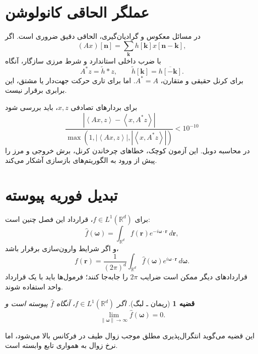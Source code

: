 \documentclass[12pt,openany,oneside]{book}
\newtheorem{theorem}{قضیه}[chapter]
\newcommand{\R}{\mathbb{R}}
\newcommand{\norm}[1]{\left\lVert #1\right\rVert}
\newcommand{\inner}[2]{\left\langle #1,#2\right\rangle}
\newcommand{\vect}[1]{\bm{#1}}
\begin{document}
\section{عملگر الحاقی کانولوشن}

در مسائل معکوس و گرادیان‌گیری، الحاقی دقیق ضروری است. اگر
\begin{equation}
(Ax)[\vect n]=\sum_{\vect k}h[\vect k]x[\vect n-\vect k],
\end{equation}
با ضرب داخلی استاندارد و شرط مرزی سازگار، آنگاه
\begin{equation}
A^*z=\widetilde h*z,
\qquad
\widetilde h[\vect k]=\overline{h[-\vect k]}.
\label{eq:conv-adjoint}
\end{equation}
برای کرنل حقیقی و متقارن، \(A^*=A\). اما برای تاری حرکت جهت‌دار یا مشتق، این برابری برقرار نیست.

\begin{workshopbox}
برای بردارهای تصادفی \(x,z\)، باید بررسی شود
\begin{equation}
\frac{|\inner{Ax}{z}-\inner{x}{A^*z}|}
{\max(1,|\inner{Ax}{z}|,|\inner{x}{A^*z}|)}<10^{-10}
\end{equation}
در محاسبه دوبل. این آزمون کوچک، خطاهای چرخاندن کرنل، برش خروجی و مرز را پیش از ورود به الگوریتم‌های
بازسازی آشکار می‌کند.
\end{workshopbox}

\section{تبدیل فوریه پیوسته}

برای \(f\in L^1(\R^d)\)، قرارداد این فصل چنین است:
\begin{equation}
\widehat f(\vect\omega)=\int_{\R^d}f(\vect r)e^{-i\vect\omega\cdot\vect r}\,d\vect r,
\label{eq:ctft}
\end{equation}
و اگر شرایط وارون‌سازی برقرار باشد،
\begin{equation}
f(\vect r)=\frac{1}{(2\pi)^d}\int_{\R^d}\widehat f(\vect\omega)
 e^{i\vect\omega\cdot\vect r}\,d\vect\omega.
\label{eq:ictft}
\end{equation}
قراردادهای دیگر ممکن است ضرایب \(2\pi\) را جابه‌جا کنند؛ فرمول‌ها باید با یک قرارداد واحد استفاده شوند.

\begin{theorem}[ریمان ـ لبگ]
اگر \(f\in L^1(\R^d)\)، آنگاه \(\widehat f\) پیوسته است و
\begin{equation}
\lim_{\norm{\vect\omega}\to\infty}\widehat f(\vect\omega)=0.
\end{equation}
\end{theorem}
این قضیه می‌گوید انتگرال‌پذیری مطلق موجب زوال طیف در فرکانس بالا می‌شود، اما نرخ زوال به همواری تابع وابسته است.
\end{document}
